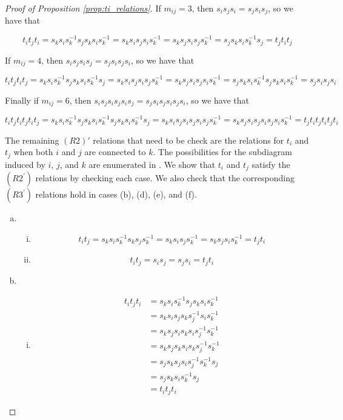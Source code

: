 \documentclass[11pt]{amsart}
\theoremstyle{definition}
\begin{document}
\begin{proof}[Proof of Proposition \ref{prop:ti_relations}]
\noindent If $m_{ij} = 3$, then $s_is_js_i = s_js_is_j$, so we have that 

$$t_it_jt_i = s_ks_is_k^{-1}s_js_ks_is_k^{-1} = s_ks_is_js_is_k^{-1} = s_ks_js_is_js_k^{-1} = s_js_ks_is_k^{-1}s_j = t_jt_it_j$$

\noindent If $m_{ij} = 4$, then $s_is_js_is_j = s_js_is_js_i$, so we have that

$$t_it_jt_it_j = s_ks_is_k^{-1}s_js_ks_is_k^{-1}s_j = s_ks_is_js_is_js_k^{-1} = s_ks_js_is_js_is_k^{-1} = s_js_ks_is_k^{-1}s_js_ks_is_k^{-1} = s_js_is_js_i$$

\noindent Finally if $m_{ij} = 6$, then $s_is_js_is_js_is_j = s_js_is_js_is_js_i$, so we have that

$$t_it_jt_it_jt_it_j = s_ks_is_k^{-1}s_js_ks_is_k^{-1}s_js_ks_is_k^{-1}s_j = s_ks_is_js_is_js_is_js_k^{-1} = s_ks_js_is_js_is_js_is_k^{-1} = t_jt_it_jt_it_jt_i$$




The remaining $(R2)'$ relations that need to be check are the relations for $t_i$ and $t_j$ when both $i$ and $j$ are connected to $k$.  The possibilities for the subdiagram induced by $i$, $j$, and $k$ are enumerated in .  We show that $t_i$ and $t_j$ satisfy the $(R2^\prime)$ relations by checking each case.  We also check that the corresponding $(R3^\prime)$ relations hold in cases (b), (d), (e), and (f).


\begin{enumerate}[a)]
\item
\begin{enumerate}[i)]
\item $$t_it_j = s_ks_is_k^{-1}s_ks_js_k^{-1} = s_ks_is_js_k^{-1} = s_ks_js_is_k^{-1} = t_jt_i$$
\item $$t_it_j = s_is_j = s_js_i = t_jt_i$$
\end{enumerate}
\item
\begin{enumerate}[i)]
\item
\begin{align*}
t_it_jt_i &= s_ks_is_k^{-1}s_js_ks_is_k^{-1}\\
&= s_ks_is_js_ks_j^{-1}s_is_k^{-1}\\
&= s_ks_js_is_ks_is_j^{-1}s_k^{-1}\\
&= s_ks_js_ks_is_ks_j^{-1}s_k^{-1}\\
&= s_js_ks_js_is_j^{-1}s_k^{-1}s_j\\
&= s_js_ks_is_k^{-1}s_j\\
&= t_it_jt_i
\end{align*}


\end{enumerate}
\end{enumerate}
\end{proof}
\end{document}
